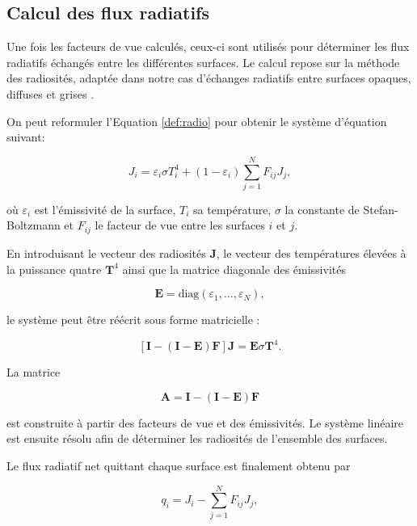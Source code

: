 \subsection{Calcul des flux radiatifs}

Une fois les facteurs de vue calculés, ceux-ci sont utilisés pour déterminer les flux radiatifs échangés entre les différentes surfaces. Le calcul repose sur la méthode des radiosités, adaptée dans notre cas d'échanges radiatifs entre surfaces opaques, diffuses et grises \cite{howell}.

On peut reformuler l'Equation \ref{def:radio} pour obtenir le système d'équation suivant:

\begin{equation}
J_i
=
\varepsilon_i \sigma T_i^4
+
(1-\varepsilon_i)
\sum_{j=1}^{N}
F_{ij}J_j,
\label{eq:radiosity}
\end{equation}

où $\varepsilon_i$ est l'émissivité de la surface, $T_i$ sa température, $\sigma$ la constante de Stefan-Boltzmann et $F_{ij}$ le facteur de vue entre les surfaces $i$ et $j$.

En introduisant le vecteur des radiosités $\mathbf{J}$, le vecteur des températures élevées à la puissance quatre $\mathbf{T}^4$ ainsi que la matrice diagonale des émissivités

\begin{equation}
\mathbf{E}
=
\mathrm{diag}(\varepsilon_1,\ldots,\varepsilon_N),
\end{equation}

le système peut être réécrit sous forme matricielle :

\begin{equation}
\left[
\mathbf{I}
-
(\mathbf{I}-\mathbf{E})\mathbf{F}
\right]
\mathbf{J}
=
\mathbf{E}\sigma\mathbf{T}^4.
\label{eq:systeme_radiosite}
\end{equation}

La matrice

\begin{equation}
\mathbf{A}
=
\mathbf{I}
-
(\mathbf{I}-\mathbf{E})\mathbf{F}
\end{equation}

est construite à partir des facteurs de vue et des émissivités. Le système linéaire est ensuite résolu afin de déterminer les radiosités de l'ensemble des surfaces.

Le flux radiatif net quittant chaque surface est finalement obtenu par

\begin{equation}
q_i
=
J_i
-
\sum_{j=1}^{N}
F_{ij}J_j,
\end{equation}

